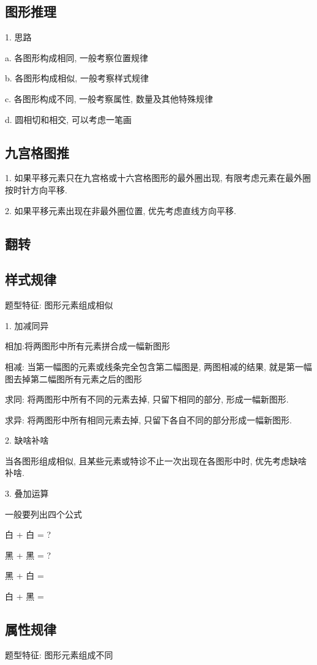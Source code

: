 \subsection{图形推理}

1. 思路

a. 各图形构成相同, 一般考察位置规律

b. 各图形构成相似, 一般考察样式规律

c. 各图形构成不同, 一般考察属性, 数量及其他特殊规律

d. 圆相切和相交, 可以考虑一笔画

\subsection{九宫格图推}
1. 如果平移元素只在九宫格或十六宫格图形的最外圈出现, 有限考虑元素在最外圈按时针方向平移.

2. 如果平移元素出现在非最外圈位置, 优先考虑直线方向平移.

\subsection{翻转}

\subsection{样式规律}
题型特征: 图形元素组成相似

1. 加减同异

相加:将两图形中所有元素拼合成一幅新图形

相减: 当第一幅图的元素或线条完全包含第二幅图是, 两图相减的结果, 就是第一幅图去掉第二幅图所有元素之后的图形

求同: 将两图形中所有不同的元素去掉, 只留下相同的部分, 形成一幅新图形.

求异: 将两图形中所有相同元素去掉, 只留下各自不同的部分形成一幅新图形.


2. 缺啥补啥

当各图形组成相似, 且某些元素或特诊不止一次出现在各图形中时, 优先考虑缺啥补啥.


3. 叠加运算

一般要列出四个公式

白 + 白 = ?

黑 + 黑 = ?

黑 + 白 =

白 + 黑 =

\subsection{属性规律}
题型特征: 图形元素组成不同

